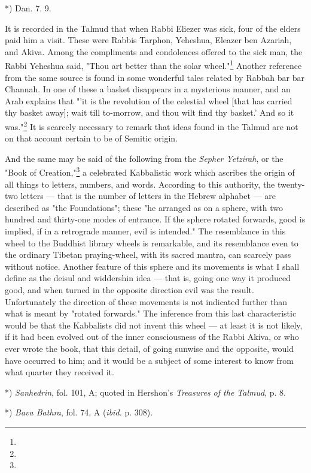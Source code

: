 \documentclass[a4paper, 11pt, oneside, polutonikogreek, english]{article}
\begin{document}
*) Dan. 7. 9.

It is recorded in the Talmud that when Rabbi Eliezer was sick, four of the elders paid him a visit. These were Rabbis Tarphon, Yeheshua, Eleazer ben Azariah, and Akiva. Among the compliments and condolences offered to the sick man, the Rabbi Yeheshua said, "Thou art better than the solar wheel."\footnote{} Another reference from the same source is found in some wonderful tales related by Rabbah bar bar Channah. In one of these a basket disappears in a mysterious manner, and an Arab explains that "'it is the revolution of the celestial wheel [that has carried thy basket away]; wait till to-morrow, and thou wilt find thy basket.' And so it was."\footnote{} It is scarcely necessary to remark that ideas found in the Talmud are not on that account certain to be of Semitic origin.

And the same may be said of the following from the \emph{Sepher Yetzirah}, or the "Book of Creation,"\footnote{} a celebrated Kabbalistic work which ascribes the origin of all things to letters, numbers, and words. According to this authority, the twenty-two letters --- that is the number of letters in the Hebrew alphabet --- are described as "the Foundations"; these "he arranged as on a sphere, with two hundred and thirty-one modes of entrance. If the sphere rotated forwards, good is implied, if in a retrograde manner, evil is intended." The resemblance in this wheel to the Buddhist library wheels is remarkable, and its resemblance even to the ordinary Tibetan praying-wheel, with its sacred mantra, can scarcely pass without notice. Another feature of this sphere and its movements is what I shall define as the deisul and widdershin idea --- that is, going one way it produced good, and when turned in the opposite direction evil was the result. Unfortunately the direction of these movements is not indicated further than what is meant by "rotated forwards." The inference from this last characteristic would be that the Kabbalists did not invent this wheel --- at least it is not likely, if it had been evolved out of the inner consciousness of the Rabbi Akiva, or who ever wrote the book, that this detail, of going sunwise and the opposite, would have occurred to him; and it would be a subject of some interest to know from what quarter they received it.

*) \emph{Sanhedrin}, fol. 101, A; quoted in Hershon's \emph{Treasures of the Talmud}, p. 8.

*) \emph{Bava Bathra}, fol. 74, A (\emph{ibid.} p. 308).
\end{document}

